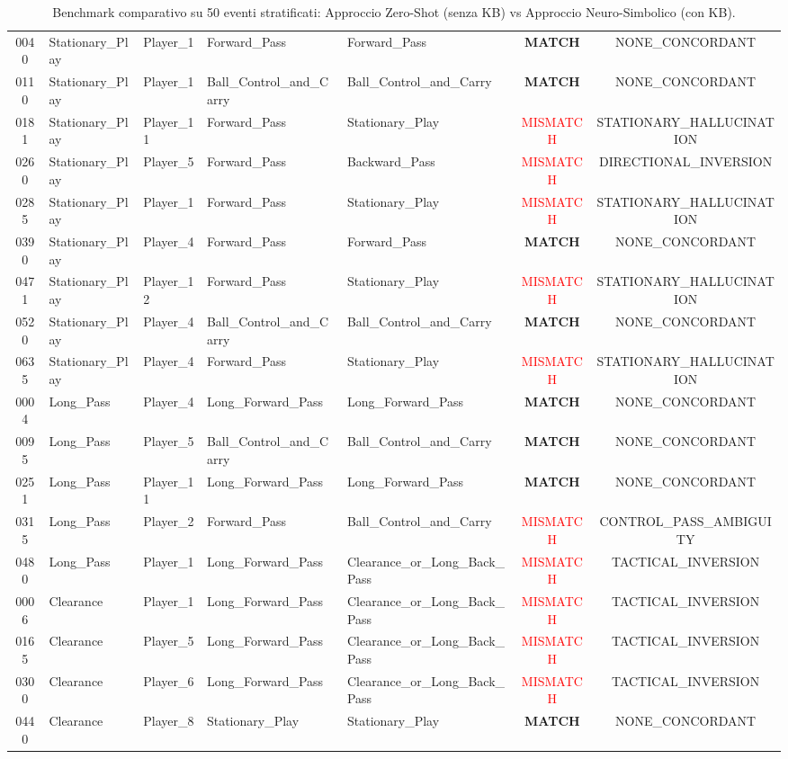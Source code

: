 \begin{table}[t]
\begin{tabular}{cllllcc}
0040 & Stationary\_Play & Player_1 & Forward\_Pass & Forward\_Pass & \textbf{MATCH} & NONE\_CONCORDANT \\
0110 & Stationary\_Play & Player_1 & Ball\_Control\_and\_Carry & Ball\_Control\_and\_Carry & \textbf{MATCH} & NONE\_CONCORDANT \\
0181 & Stationary\_Play & Player_11 & Forward\_Pass & Stationary\_Play & \textcolor{red}{MISMATCH} & STATIONARY\_HALLUCINATION \\
0260 & Stationary\_Play & Player_5 & Forward\_Pass & Backward\_Pass & \textcolor{red}{MISMATCH} & DIRECTIONAL\_INVERSION \\
0285 & Stationary\_Play & Player_1 & Forward\_Pass & Stationary\_Play & \textcolor{red}{MISMATCH} & STATIONARY\_HALLUCINATION \\
0390 & Stationary\_Play & Player_4 & Forward\_Pass & Forward\_Pass & \textbf{MATCH} & NONE\_CONCORDANT \\
0471 & Stationary\_Play & Player_12 & Forward\_Pass & Stationary\_Play & \textcolor{red}{MISMATCH} & STATIONARY\_HALLUCINATION \\
0520 & Stationary\_Play & Player_4 & Ball\_Control\_and\_Carry & Ball\_Control\_and\_Carry & \textbf{MATCH} & NONE\_CONCORDANT \\
0635 & Stationary\_Play & Player_4 & Forward\_Pass & Stationary\_Play & \textcolor{red}{MISMATCH} & STATIONARY\_HALLUCINATION \\
0004 & Long\_Pass & Player_4 & Long\_Forward\_Pass & Long\_Forward\_Pass & \textbf{MATCH} & NONE\_CONCORDANT \\
0095 & Long\_Pass & Player_5 & Ball\_Control\_and\_Carry & Ball\_Control\_and\_Carry & \textbf{MATCH} & NONE\_CONCORDANT \\
0251 & Long\_Pass & Player_11 & Long\_Forward\_Pass & Long\_Forward\_Pass & \textbf{MATCH} & NONE\_CONCORDANT \\
0315 & Long\_Pass & Player_2 & Forward\_Pass & Ball\_Control\_and\_Carry & \textcolor{red}{MISMATCH} & CONTROL\_PASS\_AMBIGUITY \\
0480 & Long\_Pass & Player_1 & Long\_Forward\_Pass & Clearance\_or\_Long\_Back\_Pass & \textcolor{red}{MISMATCH} & TACTICAL\_INVERSION \\
0006 & Clearance & Player_1 & Long\_Forward\_Pass & Clearance\_or\_Long\_Back\_Pass & \textcolor{red}{MISMATCH} & TACTICAL\_INVERSION \\
0165 & Clearance & Player_5 & Long\_Forward\_Pass & Clearance\_or\_Long\_Back\_Pass & \textcolor{red}{MISMATCH} & TACTICAL\_INVERSION \\
0300 & Clearance & Player_6 & Long\_Forward\_Pass & Clearance\_or\_Long\_Back\_Pass & \textcolor{red}{MISMATCH} & TACTICAL\_INVERSION \\
0440 & Clearance & Player_8 & Stationary\_Play & Stationary\_Play & \textbf{MATCH} & NONE\_CONCORDANT \\
\hline
\end{tabular}
\caption{Benchmark comparativo su 50 eventi stratificati: Approccio Zero-Shot (senza KB) vs Approccio Neuro-Simbolico (con KB).}
\label{tab:benchmark_stratified_50_clips}
\end{table}